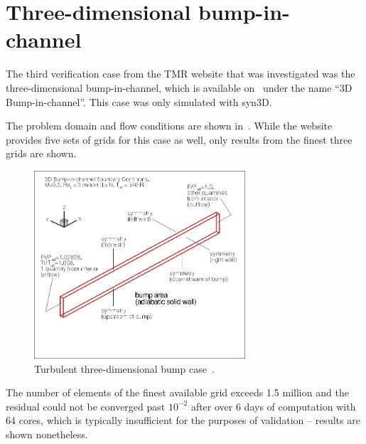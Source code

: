 \section{Three-dimensional bump-in-channel}
\label{sec:syn3dbump}
The third verification case from the TMR website that was investigated was the three-dimensional bump-in-channel, which is available on~\cite{tmr} under the name ``3D Bump-in-channel''. This case was only simulated with syn3D.

The problem domain and flow conditions are shown in~. While the website provides five sets of grids for this case as well, only results from the finest three grids are shown.
\begin{figure}
    \centering
    \includegraphics[width=0.7\textwidth]{figs/3dbump/bump3dBCpic1.jpg}
    \caption{Turbulent three-dimensional bump case~\cite{tmr}.}
    \label{fig:3dbump}
\end{figure}

The number of elements of the finest available grid exceeds 1.5 million and the residual could not be converged past $10^{-2}$ after over 6 days of computation with 64 cores, which is typically insufficient for the purposes of validation -- results are shown nonetheless.

